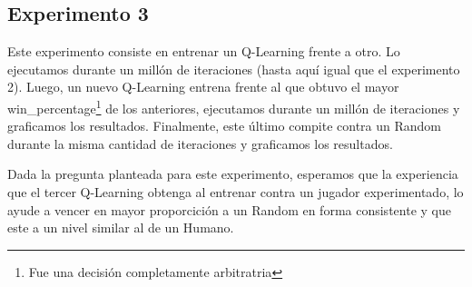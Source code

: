 \subsection{Experimento 3}

Este experimento consiste en entrenar un Q-Learning frente a otro. Lo ejecutamos durante un mill\'on de iteraciones (hasta aqu\'i igual que el experimento 2). Luego, un nuevo Q-Learning entrena frente al que obtuvo el mayor win\_percentage\footnote{Fue una decisi\'on completamente arbitratria} de los anteriores, ejecutamos durante un mill\'on de iteraciones y graficamos los resultados. Finalmente, este \'ultimo compite contra un Random durante la misma cantidad de iteraciones y graficamos los resultados.

Dada la pregunta planteada para este experimento, esperamos que la experiencia que el tercer Q-Learning obtenga al entrenar contra un jugador experimentado, lo ayude a vencer en mayor proporcici\'on a un Random en forma consistente y que este a un nivel similar al de un Humano.
